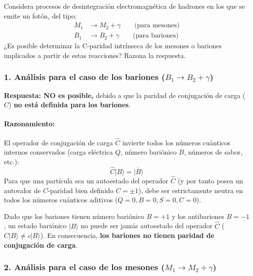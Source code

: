 \begin{problema}
Considera procesos de desintegración electromagnética de hadrones en los que se emite un fotón, del tipo:
\begin{align*}
M_1 &\rightarrow M_2 + \gamma \qquad \text{(para mesones)} \\
B_1 &\rightarrow B_2 + \gamma \qquad \text{(para bariones)}
\end{align*}
¿Es posible determinar la C-paridad intrínseca de los mesones o bariones implicados a partir de estas reacciones? Razona la respuesta.

\tcblower

\subsubsection*{1. Análisis para el caso de los bariones ($B_1 \rightarrow B_2 + \gamma$)}

\textbf{Respuesta: NO es posible,} debido a que la paridad de conjugación de carga ($C$) \textbf{no está definida para los bariones}.

\paragraph{Razonamiento:}
El operador de conjugación de carga $\hat{C}$ invierte todos los números cuánticos internos conservados (carga eléctrica $Q$, número bariónico $B$, números de sabor, etc.):
\begin{equation*}
\hat{C} |B\rangle = |\bar{B}\rangle
\end{equation*}
Para que una partícula sea un autoestado del operador $\hat{C}$ (y por tanto posea un autovalor de $C$-paridad bien definido $C = \pm 1$), debe ser estrictamente neutra en todos los números cuánticos aditivos ($Q = 0, B = 0, S = 0, C = 0$).

Dado que los bariones tienen número bariónico $B = +1$ y los antibariones $B = -1$, un estado bariónico $|B\rangle$ no puede ser jamás autoestado del operador $\hat{C}$ ($\hat{C} |B\rangle \neq c |B\rangle$). En consecuencia, \textbf{los bariones no tienen paridad de conjugación de carga}.

\subsubsection*{2. Análisis para el caso de los mesones ($M_1 \rightarrow M_2 + \gamma$)}


\end{problema}
